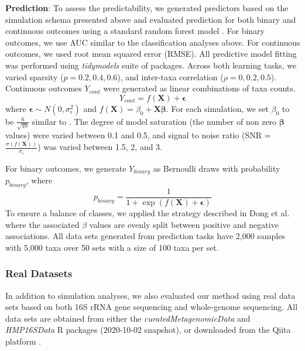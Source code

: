 \documentclass{article}
\begin{document}
\noindent \textbf{Prediction}: To assess the predictability, we generated predictors based on the simulation schema presented above and evaluated prediction for both binary and continuous outcomes using a standard random forest model \cite{breiman2001}. For binary outcomes, we use AUC similar to the classification analyses above. For continuous outcomes, we used root mean squared error (RMSE). All predictive model fitting was performed using \emph{tidymodels} \cite{kuhn2020} suite of packages. Across both learning tasks, we varied sparsity ($p = 0.2, 0.4, 0.6$), and inter-taxa correlation ($\rho = 0, 0.2, 0.5$). Continuous outcomes $Y_{cont}$ were generated as linear combinations of taxa counts.  
\begin{equation}
    Y_{cont} = f(\mathbf{X}) + \mathbf{\epsilon}
\end{equation}
where $\mathbf{\epsilon} \sim N(0, \sigma_{\epsilon}^2)$ and $f(\mathbf{X}) = \beta_0 + \mathbf{X}\mathbf{\beta}$. For each simulation, we set $\beta_0$ to be $\frac{6}{\sqrt{10}}$ similar to \cite{xiao2018}. The degree of model saturation (the number of non zero $\mathbf{\beta}$ values) were varied between 0.1 and 0.5, and signal to noise ratio (SNR = $\frac{\sigma(f(\mathbf{X}))}{\sigma_{\epsilon}}$) was varied between 1.5, 2, and 3. 

For binary outcomes, we generate $Y_{binary}$ as Bernoulli draws with probability $p_{binary}$, where 
\begin{equation}
    p_{binary} = \frac{1}{1 + \exp(f(\mathbf{X}) + \mathbf{\epsilon})}
\end{equation}
To ensure a balance of classes, we applied the strategy described in Dong et al. \cite{dong2020} where the associated $\beta$ values are evenly split between positive and negative associations. All data sets generated from prediction tasks have 2,000 samples with 5,000 taxa over 50 sets with a size of 100 taxa per set.  

\subsubsection*{Real Datasets}

In addition to simulation analyses, we also evaluated our method using real data sets based on both 16S rRNA gene sequencing and whole-genome sequencing. All data sets are obtained from either the \emph{curatedMetagenomicData} \cite{pasolli2017} and \emph{HMP16SData} \cite{schiffer2019} R packages (2020-10-02 snapshot), or downloaded from the Qiita platform \cite{gonzalez2018}.  
\end{document}
